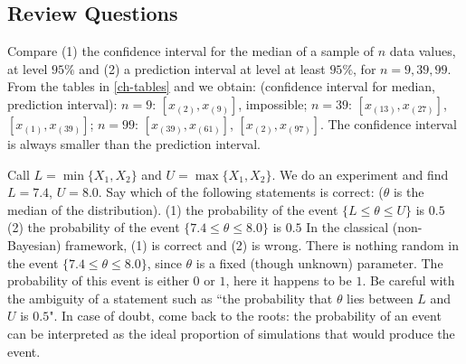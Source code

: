 %
%
%
%

\subsection{Review Questions}

 {Compare (1) the confidence interval for the median of a sample of $n$ data values, at level $95\%$
 and (2) a prediction interval at level at least $95\%$, for
 $n=9,39,99$.}
 {From the tables in \cref{ch-tables} and  we obtain:
 (confidence interval for median, prediction interval):
 $n=9$: $[x_{(2)},x_{(9)}]$, impossible;
 $n=39$: $[x_{(13)},x_{(27)}]$, $[x_{(1)},x_{(39)}]$;
 $n=99$: $[x_{(39)},x_{(61)}]$, $[x_{(2)},x_{(97)}]$.
 The confidence interval is always smaller than the prediction interval.
 }


 {Call $L=\min\{X_1, X_2\}$ and $U=\max\{X_1, X_2\}$. We do an experiment and find $L=7.4$, $U=8.0$.
 Say which of the following statements is correct: ($\theta$ is
 the median of the distribution).
 (1) the probability of the event  $\{L\leq \theta \leq U\}$ is $0.5$
 (2) the probability of the event  $\{7.4\leq \theta \leq 8.0\}$ is $0.5$
 }
 {In the classical (non-Bayesian) framework, (1) is correct and (2) is wrong.
 There is nothing random in the event $\{7.4\leq \theta \leq
 8.0\}$, since $\theta$ is a fixed (though unknown) parameter. The probability of this event is
 either $0$ or $1$, here it happens to be $1$. Be careful with the ambiguity of a statement such
 as ``the probability that $\theta$ lies between $L$ and $U$ is $0.5$". In case of doubt,
 come back to the roots: the probability of an event can be interpreted as the ideal proportion
 of simulations that would produce the event.}



